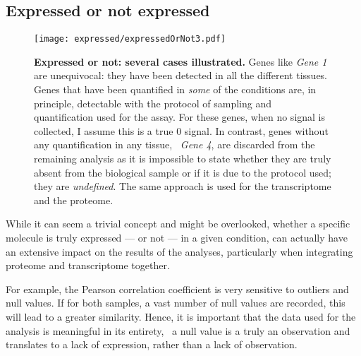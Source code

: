 \subsection{Expressed or not expressed}\label{sec:ExpressedOrNot}
\vspace{-0.3in}
\begin{figure}[!htb]
    \texttt{[image: expressed/expressedOrNot3.pdf]}\centering
      \caption[Expressed or not: several cases illustrated]
      {\label{fig:DefineExpression}\textbf{Expressed or not: several cases
      illustrated.}\smallbreak{} Genes like \emph{Gene 1} are unequivocal: they have been
      detected in all the different tissues. Genes that have been quantified in
      \emph{some} of the conditions are, in principle, detectable with the
      protocol of sampling and quantification used for the assay.
      For these genes, when no signal is collected, I assume this is a true $0$ signal.
      In contrast, genes without any quantification
      in any tissue, \eg\ \emph{Gene 4}, are discarded from the remaining analysis as
      it is impossible to state
      whether they are truly absent from the biological sample or if it is due
      to the protocol used; they are \emph{undefined}. The same approach is used
      for the transcriptome and the proteome.}
\end{figure}

While it can seem a trivial concept and might be overlooked, whether a specific
molecule is truly expressed --- or not --- in a given condition, can actually have
an extensive impact on the results of the analyses, particularly when integrating
proteome and transcriptome together.

For example, the Pearson correlation coefficient is very
sensitive to outliers and null values. If for both samples, a vast number of
null values are recorded, this will lead to a greater similarity.
Hence, it is important that the data used for the analysis is meaningful in
its entirety, \ie\ a null value is a truly an observation and translates to
a lack of expression, rather than a lack of observation.

